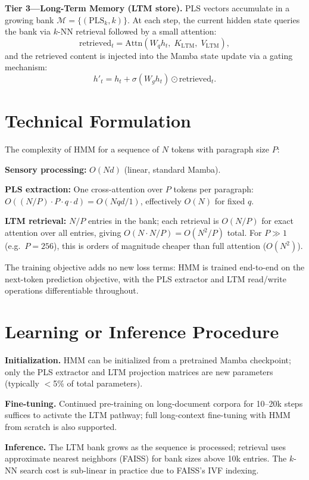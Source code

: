 \documentclass[10pt,twocolumn]{article}
\begin{document}
\textbf{Tier 3---Long-Term Memory (LTM store).}
PLS vectors accumulate in a growing bank $\mathcal{M} = \{(\mathrm{PLS}_k, k)\}$.
At each step, the current hidden state queries the bank via $k$-NN retrieval
followed by a small attention:
\[
\mathrm{retrieved}_t = \mathrm{Attn}\!\left(
  W_q h_t,\; K_{\mathrm{LTM}},\; V_{\mathrm{LTM}}
\right),
\]
and the retrieved content is injected into the Mamba state update via a gating
mechanism:
\[
h'_t = h_t + \sigma(W_g h_t) \odot \mathrm{retrieved}_t.
\]

\section{Technical Formulation}

The complexity of HMM for a sequence of $N$ tokens with paragraph size $P$:

\textbf{Sensory processing:} $O(Nd)$ (linear, standard Mamba).

\textbf{PLS extraction:} One cross-attention over $P$ tokens per paragraph:
$O((N/P) \cdot P \cdot q \cdot d) = O(Nqd/1)$, effectively $O(N)$ for fixed $q$.

\textbf{LTM retrieval:} $N/P$ entries in the bank; each retrieval is $O(N/P)$ for
exact attention over all entries, giving $O(N \cdot N/P) = O(N^2/P)$ total.
For $P \gg 1$ (e.g.\ $P = 256$), this is orders of magnitude cheaper than full
attention ($O(N^2)$).

The training objective adds no new loss terms: HMM is trained end-to-end on the
next-token prediction objective, with the PLS extractor and LTM read/write
operations differentiable throughout.

\section{Learning or Inference Procedure}

\textbf{Initialization.} HMM can be initialized from a pretrained Mamba checkpoint;
only the PLS extractor and LTM projection matrices are new parameters (typically
$<$5\% of total parameters).

\textbf{Fine-tuning.} Continued pre-training on long-document corpora for 10--20k
steps suffices to activate the LTM pathway; full long-context fine-tuning with HMM
from scratch is also supported.

\textbf{Inference.} The LTM bank grows as the sequence is processed; retrieval uses
approximate nearest neighbors (FAISS) for bank sizes above 10k entries. The $k$-NN
search cost is sub-linear in practice due to FAISS's IVF indexing.
\end{document}

